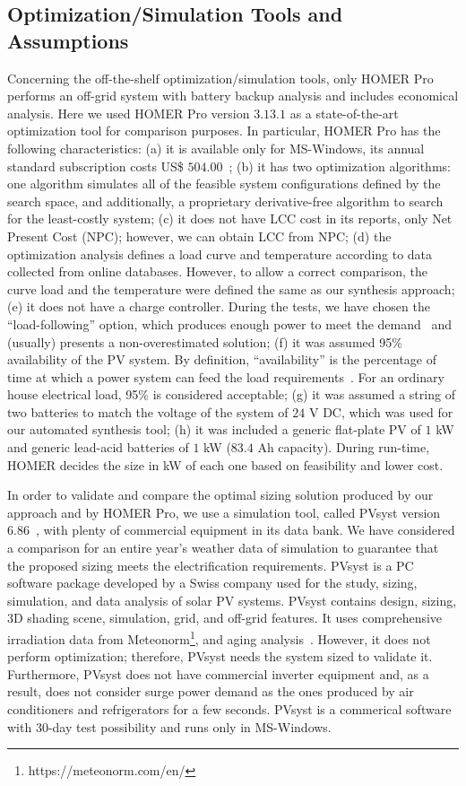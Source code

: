 \documentclass[runningheads]{llncs}
\begin{document}
\subsection{Optimization/Simulation Tools and Assumptions}
Concerning the off-the-shelf optimization/simulation tools, only HOMER Pro performs an off-grid system with battery backup analysis and includes economical analysis. Here we used HOMER Pro version $3.13.1$ as a state-of-the-art optimization tool for comparison purposes. In particular, HOMER Pro has the following characteristics:
(a) it is available only for MS-Windows, its annual standard subscription costs US\$ $504.00$~\cite{HOMER}; 
(b) it has two optimization algorithms: one algorithm simulates all of the feasible system configurations defined by the search space, and additionally, a proprietary derivative-free algorithm to search for the least-costly system;
(c) it does not have LCC cost in its reports, only Net Present Cost (NPC); however, we can obtain LCC from NPC; 
(d) the optimization analysis defines a load curve and temperature according to data collected from online databases. However, to allow a correct comparison, the curve load and the temperature were defined the same as our synthesis approach; 
(e) it does not have a charge controller. During the tests, we have chosen the ``load-following'' option, which produces enough power to meet the demand~\cite{HOMER} and (usually) presents a non-overestimated solution; 
(f) it was assumed 95\% availability of the PV system. By definition, ``availability'' is the percentage of time at which a power system can feed the load requirements~\cite{Khatib2014}. For an ordinary house electrical load, 95\% is considered acceptable;
(g) it was assumed a string of two batteries to match the voltage of the system of $24$ V DC, which was used for our automated synthesis tool; 
(h) it was included a generic flat-plate PV of $1$ kW and generic lead-acid batteries of $1$ kW ($83.4$ Ah capacity). During run-time, HOMER decides the size in kW of each one based on feasibility and lower cost.

In order to validate and compare the optimal sizing solution produced by our approach and by HOMER Pro, we use a simulation tool, called PVsyst version $6.86$~\cite{PVsyst}, with plenty of commercial equipment in its data bank. We have considered a comparison for an entire year's weather data of simulation to guarantee that the proposed sizing meets the electrification requirements. PVsyst is a PC software package developed by a Swiss company used for the study, sizing, simulation, and data analysis of solar PV systems. PVsyst contains design, sizing, 3D shading scene, simulation, grid, and off-grid features. It uses comprehensive irradiation data from Meteonorm\footnote{https://meteonorm.com/en/}, and aging analysis~\cite{PVsyst2017}. However, it does not perform optimization; therefore, PVsyst needs the system sized to validate it. Furthermore, PVsyst does not have commercial inverter equipment and, as a result, does not consider surge power demand as the ones produced by air conditioners and refrigerators for a few seconds. PVsyst is a commerical software with $30$-day test possibility and runs only in MS-Windows.
\end{document}
